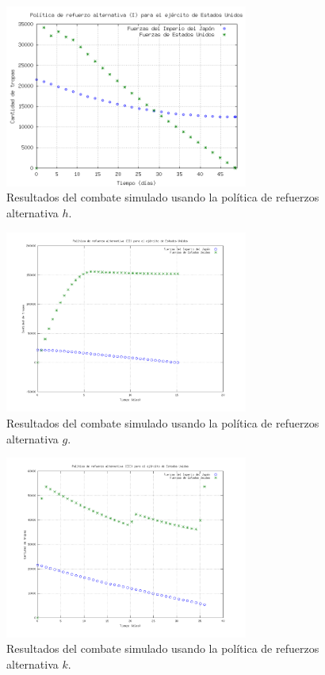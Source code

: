 \documentclass{sig-alternate}
\begin{document}
\begin{figure}[h]
\begin{center}
\includegraphics[width=8cm]{reinforce2.png}
\caption{\label{fig:reinforce2}Resultados del combate simulado usando la política de refuerzos alternativa $h$.}
\end{center}
\end{figure}

\begin{figure}[h]
\begin{center}
\includegraphics[width=8cm]{reinforce3.png}
\caption{\label{fig:reinforce3}Resultados del combate simulado usando la política de refuerzos alternativa $g$.}
\end{center}
\end{figure}


\begin{figure}[h]
\begin{center}
\includegraphics[clip, width=8cm]{reinforce4.png}
\caption{\label{fig:reinforce4}Resultados del combate simulado usando la política de refuerzos alternativa $k$.}
\end{center}
\end{figure}
\end{document}

